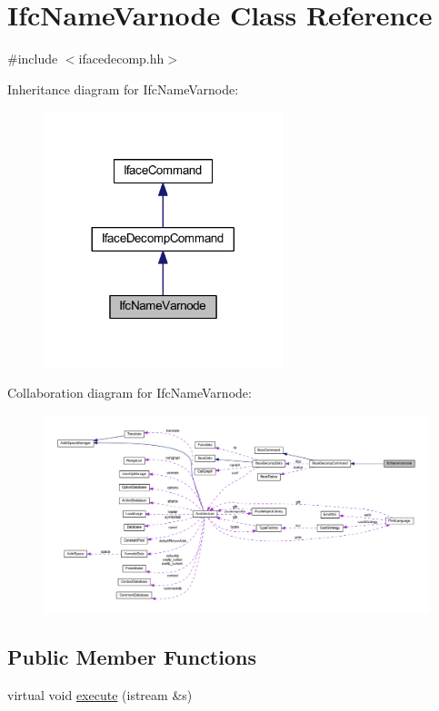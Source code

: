 \hypertarget{class_ifc_name_varnode}{}\section{Ifc\+Name\+Varnode Class Reference}
\label{class_ifc_name_varnode}


{\ttfamily \#include $<$ifacedecomp.\+hh$>$}



Inheritance diagram for Ifc\+Name\+Varnode\+:
\nopagebreak
\begin{figure}[H]
\begin{center}
\leavevmode
\includegraphics[width=197pt]{class_ifc_name_varnode__inherit__graph}
\end{center}
\end{figure}


Collaboration diagram for Ifc\+Name\+Varnode\+:
\nopagebreak
\begin{figure}[H]
\begin{center}
\leavevmode
\includegraphics[width=350pt]{class_ifc_name_varnode__coll__graph}
\end{center}
\end{figure}
\subsection*{Public Member Functions}
\begin{DoxyCompactItemize}
\item 
virtual void \mbox{\hyperlink{class_ifc_name_varnode_a211fbdeb57899f8999a86b8386b075a6}{execute}} (istream \&s)
\end{DoxyCompactItemize}
